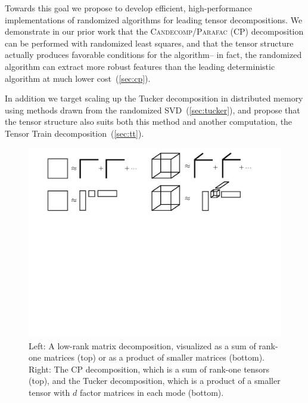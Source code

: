 Towards this goal we propose to develop efficient, high-performance implementations of randomized algorithms for leading tensor decompositions. We demonstrate in our prior work that the \textsc{Candecomp/Parafac} (CP) decomposition can be performed with randomized least squares, and that the tensor structure actually produces favorable conditions for the algorithm-- in fact, the randomized algorithm can extract more robust features than the leading deterministic algorithm at much lower cost~(\cref{sec:cp}). 

In addition we target scaling up the Tucker decomposition in distributed memory using methods drawn from the randomized SVD~(\cref{sec:tucker}), and propose that the tensor structure also suits both this method and another computation, the Tensor Train decomposition~(\cref{sec:tt}). 
%
\begin{figure}
  \centering 
  \includegraphics[width=\linewidth]{thpropfigs/decomps}
  \caption{Left: A low-rank matrix decomposition, visualized as a sum of rank-one matrices (top) or as a product of smaller matrices (bottom). Right: The CP decomposition, which is a sum of rank-one tensors (top), and the Tucker decomposition, which is a product of a smaller tensor with $d$ factor matrices in each mode (bottom).}
  \label{fig:decomps}
\end{figure}
%


